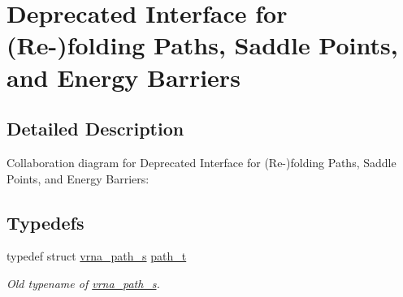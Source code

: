 \hypertarget{group__paths__deprecated}{}\section{Deprecated Interface for (Re-\/)folding Paths, Saddle Points, and Energy Barriers}
\label{group__paths__deprecated}


\subsection{Detailed Description}
Collaboration diagram for Deprecated Interface for (Re-\/)folding Paths, Saddle Points, and Energy Barriers\+:
\subsection*{Typedefs}
\begin{DoxyCompactItemize}
\item 
typedef struct \mbox{\hyperlink{group__paths_structvrna__path__s}{vrna\+\_\+path\+\_\+s}} \mbox{\hyperlink{group__paths__deprecated_gab6b8737d5377e70a7815d04aae7fd884}{path\+\_\+t}}
\begin{DoxyCompactList}\small\item\em Old typename of \mbox{\hyperlink{group__paths_structvrna__path__s}{vrna\+\_\+path\+\_\+s}}. \end{DoxyCompactList}\end{DoxyCompactItemize}
